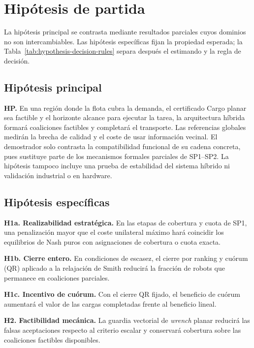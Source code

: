 \section{Hipótesis de partida}
\label{sec:hypotheses}

La hipótesis principal se contrasta mediante resultados parciales cuyos dominios
no son intercambiables. Las hipótesis específicas fijan la propiedad esperada;
la Tabla~\ref{tab:hypothesis-decision-rules} separa después el estimando y la regla
de decisión.

\subsection{Hipótesis principal}

\noindent\textbf{HP.}
En una región donde la flota cubra la demanda, el certificado Cargo planar sea
factible y el horizonte alcance para ejecutar la tarea, la arquitectura híbrida
formará coaliciones factibles y completará el transporte. Las referencias
globales medirán la brecha de calidad y el coste de usar información vecinal. El
demostrador solo contrasta la compatibilidad funcional de su cadena concreta,
pues sustituye parte de los mecanismos formales parciales de SP1--SP2. La hipótesis tampoco
incluye una prueba de estabilidad del sistema híbrido ni validación industrial o
en hardware.

\subsection{Hipótesis específicas}

\noindent\textbf{H1a. Realizabilidad estratégica.}
En las etapas de cobertura y cuota de SP1, una penalización mayor que el coste
unilateral máximo hará coincidir los equilibrios de Nash puros con asignaciones
de cobertura o cuota exacta.

\noindent\textbf{H1b. Cierre entero.}
En condiciones de escasez, el cierre por ranking y cuórum (QR) aplicado a la
relajación de Smith reducirá la fracción de robots que permanece en coaliciones
parciales.

\noindent\textbf{H1c. Incentivo de cuórum.}
Con el cierre QR fijado, el beneficio de cuórum aumentará el valor de las cargas
completadas frente al beneficio lineal.

\noindent\textbf{H2. Factibilidad mecánica.}
La guardia vectorial de \emph{wrench} planar reducirá las falsas aceptaciones
respecto al criterio escalar y conservará cobertura sobre las coaliciones
factibles disponibles.


